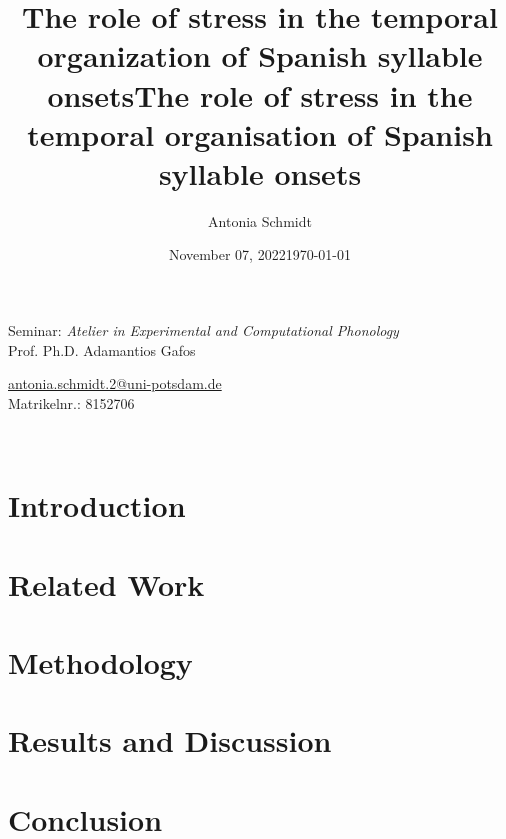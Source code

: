 \documentclass[a4paper,12pt]{article}               %
\title{The role of stress in the temporal organization of Spanish syllable onsets}
\author{Antonia Schmidt}
\date{November 07, 2022}
\begin{document}

\begin{center}
    \begin{large}
    Seminar: \textit{Atelier in Experimental and Computational Phonology}\\
    Prof. Ph.D. Adamantios Gafos
    \end{large}
    \end{center}
    
    \title{The role of stress in the temporal organisation of Spanish syllable onsets}
    \date{\vspace{-5ex}}
    {\let\newpage\relax\maketitle}
    \thispagestyle{empty}
        
        \begin{center}
        \begin{large}
        \end{large}
        \url{antonia.schmidt.2@uni-potsdam.de}\\
        Matrikelnr.:  8152706\\
        \vspace{3cm}
        \begin{large}
            \date{\today} \\
             \end{large}
        \end{center}
    
    \pagestyle{headings}
    
    
    \newpage


\section{Introduction}




\section{Related Work}



\section{Methodology}
\label{sec:methods}




\section{Results and Discussion}



\section{Conclusion}


\newpage


\end{document}
